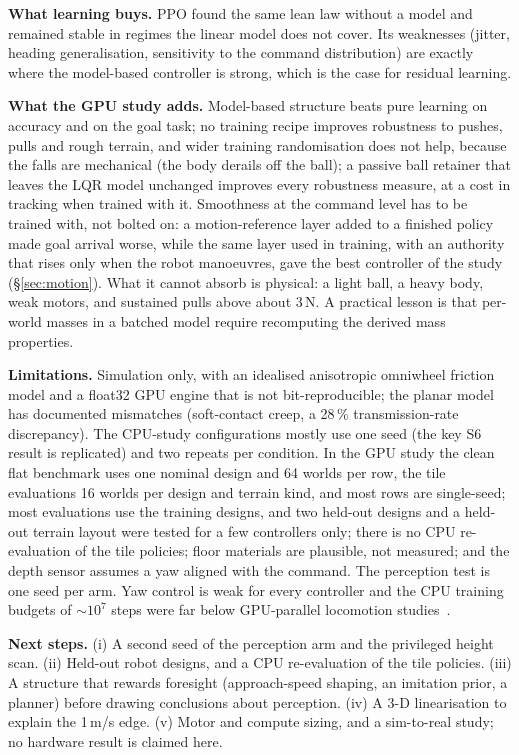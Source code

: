 \documentclass[conference]{IEEEtran}
\theoremstyle{remark}
\begin{document}
\textbf{What learning buys.} PPO found the same lean law without a model and remained stable in regimes the linear model does not cover. Its weaknesses (jitter, heading generalisation, sensitivity to the command distribution) are exactly where the model-based controller is strong, which is the case for residual learning.

\textbf{What the GPU study adds.} Model-based structure beats pure learning on accuracy and on the goal task; no training recipe improves robustness to pushes, pulls and rough terrain, and wider training randomisation does not help, because the falls are mechanical (the body derails off the ball); a passive ball retainer that leaves the LQR model unchanged improves every robustness measure, at a cost in tracking when trained with it. Smoothness at the command level has to be trained with, not bolted on: a motion-reference layer added to a finished policy made goal arrival worse, while the same layer used in training, with an authority that rises only when the robot manoeuvres, gave the best controller of the study (\S\ref{sec:motion}). What it cannot absorb is physical: a light ball, a heavy body, weak motors, and sustained pulls above about 3\,N. A practical lesson is that per-world masses in a batched model require recomputing the derived mass properties.

\textbf{Limitations.} Simulation only, with an idealised anisotropic omniwheel friction model and a float32 GPU engine that is not bit-reproducible; the planar model has documented mismatches (soft-contact creep, a 28\,\% transmission-rate discrepancy). The CPU-study configurations mostly use one seed (the key S6 result is replicated) and two repeats per condition. In the GPU study the clean flat benchmark uses one nominal design and 64 worlds per row, the tile evaluations 16 worlds per design and terrain kind, and most rows are single-seed; most evaluations use the training designs, and two held-out designs and a held-out terrain layout were tested for a few controllers only; there is no CPU re-evaluation of the tile policies; floor materials are plausible, not measured; and the depth sensor assumes a yaw aligned with the command. The perception test is one seed per arm. Yaw control is weak for every controller and the CPU training budgets of $\sim10^7$ steps were far below GPU-parallel locomotion studies~\cite{rudin2022}.

\textbf{Next steps.} (i) A second seed of the perception arm and the privileged height scan. (ii) Held-out robot designs, and a CPU re-evaluation of the tile policies. (iii) A structure that rewards foresight (approach-speed shaping, an imitation prior, a planner) before drawing conclusions about perception. (iv) A 3-D linearisation to explain the 1\,m/s edge. (v) Motor and compute sizing, and a sim-to-real study; no hardware result is claimed here.
\end{document}
